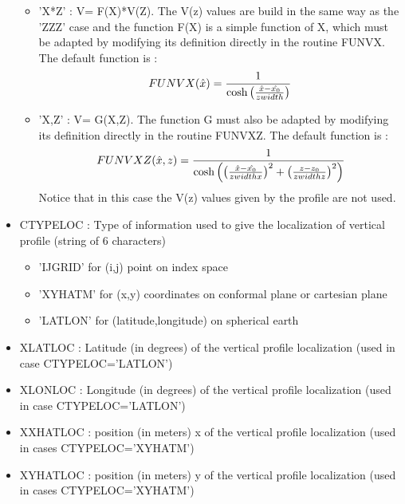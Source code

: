 \begin{itemize}
\begin{itemize}
\item 
'X*Z'    : V= F(X)*V(Z).  
The V(z) values are build in the same way as the
'ZZZ' case and the function F(X) is a simple function of X, which must be
adapted by modifying its definition directly in the routine FUNVX. The default
 function is :
$$  FUNVX(\hat{x}) = { 1 \over \cosh \left( 
   { \hat{x} - \hat{x_0} \over zwidth } \right) } $$

\item
 'X,Z'    : V= G(X,Z).  
The function  G must also be adapted  by modifying its definition directly in the
 routine FUNVXZ. The default function is :
$$  FUNVXZ(\hat{x},z) = { 1 \over \cosh \left( 
  \left( { \hat{x} - \hat{x_0} \over zwidthx } \right) ^2 +
  \left( { z - z_0 \over zwidthz } \right) ^2 
 \right) } $$
Notice that in this case the V(z) values given by the profile are not used.
\end{itemize}


\item 
CTYPELOC  : Type of information used to give the
                    localization of vertical profile (string of 6 characters)
\begin{itemize}
\item
  'IJGRID'  for (i,j) point  on index space
\item
 'XYHATM' for (x,y) coordinates on
conformal plane or cartesian plane
\item
 'LATLON' for (latitude,longitude) on   spherical earth  
\end{itemize}


\item XLATLOC : Latitude (in degrees) of the vertical
                profile localization  (used in case  CTYPELOC='LATLON') 


\item
 XLONLOC : Longitude (in degrees) of the vertical
                profile localization  (used in case  CTYPELOC='LATLON') 

\item
   XXHATLOC : position (in meters) x of the vertical profile
                    localization  (used in cases 
                                         CTYPELOC='XYHATM') 


\item
 XYHATLOC :  position (in meters) y of the vertical profile
                    localization  (used in cases 
                                         CTYPELOC='XYHATM') 


\end{itemize}
